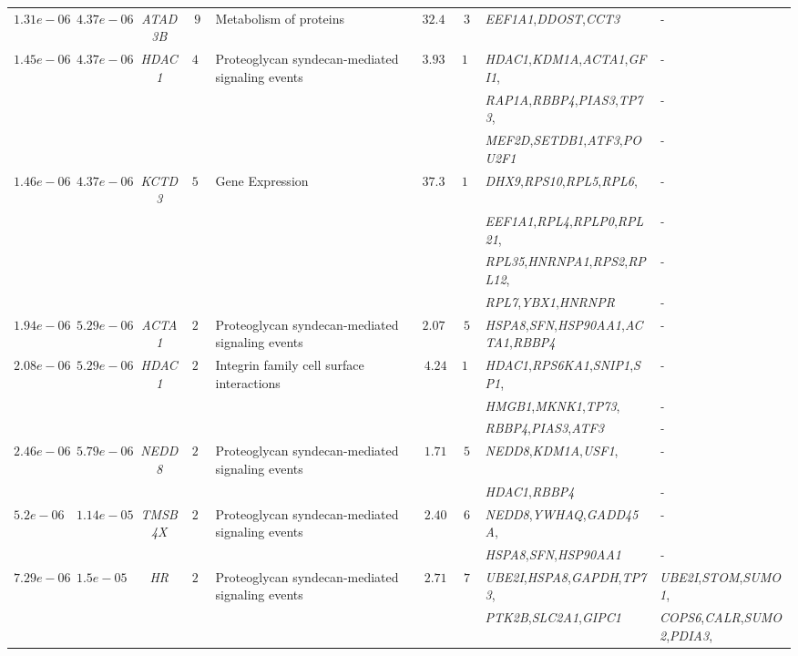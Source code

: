 \documentclass[10pt]{article}
\begin{document}
{\begin{landscape}
\begin{table}[!htbp]
{\begin{tabular}{c c c c l c c l l}
$1.31e-06$ & $4.37e-06$ & \textit{ATAD3B} & $9$ & Metabolism of proteins & $32.41$ & $3$ & \textit{EEF1A1},\textit{DDOST},\textit{CCT3}&\textit{-} \tabularnewline

$1.45e-06$ & $4.37e-06$ & \textit{HDAC1} & $47$ & Proteoglycan syndecan-mediated signaling events & $3.9336$ & $12$ & \textit{HDAC1},\textit{KDM1A},\textit{ACTA1},\textit{GFI1},&\textit{-} \tabularnewline
& & & & & & &\textit{RAP1A},\textit{RBBP4},\textit{PIAS3},\textit{TP73},&\textit{-} \tabularnewline
& & & & & & & \textit{MEF2D},\textit{SETDB1},\textit{ATF3},\textit{POU2F1}&\textit{-} \tabularnewline

$1.46e-06$ & $4.37e-06$ & \textit{KCTD3} & $54$ & Gene Expression & $37.30$ & $15$ & \textit{DHX9},\textit{RPS10},\textit{RPL5},\textit{RPL6},&\textit{-} \tabularnewline
& & & & & & &\textit{EEF1A1},\textit{RPL4},\textit{RPLP0},\textit{RPL21},&\textit{-} \tabularnewline
& & & & & & &\textit{RPL35},\textit{HNRNPA1},\textit{RPS2},\textit{RPL12},&\textit{-} \tabularnewline
& & & & & & &\textit{RPL7},\textit{YBX1},\textit{HNRNPR}&\textit{-} \tabularnewline

$1.94e-06$ & $5.29e-06$ & \textit{ACTA1} & $22$ & Proteoglycan syndecan-mediated signaling events & $2.0717$ & $5$ & \textit{HSPA8},\textit{SFN},\textit{HSP90AA1},\textit{ACTA1},\textit{RBBP4}&\textit{-} \tabularnewline

$2.08e-06$ & $5.29e-06$ & \textit{HDAC1} & $21$ & Integrin family cell surface interactions & $4.24$ & $10$ & \textit{HDAC1},\textit{RPS6KA1},\textit{SNIP1},\textit{SP1},&\textit{-} \tabularnewline
& & & & & & &\textit{HMGB1},\textit{MKNK1},\textit{TP73},&\textit{-} \tabularnewline
& & & & & & &\textit{RBBP4},\textit{PIAS3},\textit{ATF3}&\textit{-} \tabularnewline

$2.46e-06$ & $5.79e-06$ & \textit{NEDD8} & $20$ & Proteoglycan syndecan-mediated signaling events & $1.71$ & $5$ & \textit{NEDD8},\textit{KDM1A},\textit{USF1},&\textit{-} \tabularnewline
& & & & & & &\textit{HDAC1},\textit{RBBP4}&\textit{-} \tabularnewline

$5.2e-06$ & $1.14e-05$ & \textit{TMSB4X} & $23$ & Proteoglycan syndecan-mediated signaling events & $2.40$ & $6$ & \textit{NEDD8},\textit{YWHAQ},\textit{GADD45A},&\textit{-} \tabularnewline

& & & & & & &\textit{HSPA8},\textit{SFN},\textit{HSP90AA1}&\textit{-} \tabularnewline

$7.29e-06$ & $1.5e-05$ & \textit{HR} & $28$ & Proteoglycan syndecan-mediated signaling events & $2.71$ & $7$ & \textit{UBE2I},\textit{HSPA8},\textit{GAPDH},\textit{TP73},
&\textit{UBE2I},\textit{STOM},\textit{SUMO1},\tabularnewline
& & & & & & &\textit{PTK2B},\textit{SLC2A1},\textit{GIPC1} & \textit{COPS6},\textit{CALR},\textit{SUMO2},\textit{PDIA3},\tabularnewline


\end{tabular}}
\end{table}
\end{landscape}}
\end{document}
